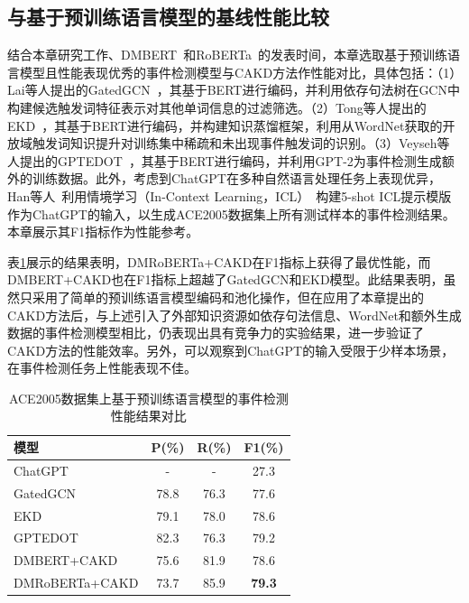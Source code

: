 \subsection{与基于预训练语言模型的基线性能比较}

结合本章研究工作、DMBERT~\cite{wang2019adversarial}和RoBERTa~\cite{liu2019roberta}的发表时间，本章选取基于预训练语言模型且性能表现优秀的事件检测模型与CAKD方法作性能对比，具体包括：（1）Lai等人提出的GatedGCN~\cite{lai2020event}，其基于BERT进行编码，并利用依存句法树在GCN中构建候选触发词特征表示对其他单词信息的过滤筛选。（2）Tong等人提出的EKD~\cite{tong2020improving}，其基于BERT进行编码，并构建知识蒸馏框架，利用从WordNet获取的开放域触发词知识提升对训练集中稀疏和未出现事件触发词的识别。（3）Veyseh等人提出的GPTEDOT~\cite{veyseh2021unleash}，其基于BERT进行编码，并利用GPT-2为事件检测生成额外的训练数据。此外，考虑到ChatGPT在多种自然语言处理任务上表现优异，Han等人~\cite{han2023information}利用情境学习（In-Context Learning，ICL）~\cite{brown2020language}构建5-shot ICL提示模版作为ChatGPT的输入，以生成ACE2005数据集上所有测试样本的事件检测结果。本章展示其F1指标作为性能参考。


表\ref{sota_comparison}展示的结果表明，DMRoBERTa+CAKD在F1指标上获得了最优性能，而DMBERT+CAKD也在F1指标上超越了GatedGCN和EKD模型。此结果表明，虽然只采用了简单的预训练语言模型编码和池化操作，但在应用了本章提出的CAKD方法后，与上述引入了外部知识资源如依存句法信息、WordNet和额外生成数据的事件检测模型相比，仍表现出具有竞争力的实验结果，进一步验证了CAKD方法的性能效率。另外，可以观察到ChatGPT的输入受限于少样本场景，在事件检测任务上性能表现不佳。

\begin{table}[htp]
\centering
    \caption{ACE2005数据集上基于预训练语言模型的事件检测性能结果对比}
	\begin{tabular}{lccc}
		\toprule
		模型 & P(\%) & R(\%) & F1(\%)  \\
		\midrule
        ChatGPT & - & - & 27.3 \\
        \midrule
		GatedGCN & 78.8 & 76.3 & 77.6       \\
		EKD & 79.1 & 78.0 & 78.6  \\ 
        GPTEDOT & 82.3 & 76.3 & 79.2 \\ \midrule  
        DMBERT+CAKD & 75.6  & 81.9  & 78.6  \\ 
        DMRoBERTa+CAKD & 73.7  & 85.9  & \textbf{79.3}  \\
		\bottomrule
	\end{tabular}
	\label{sota_comparison}
\end{table}

